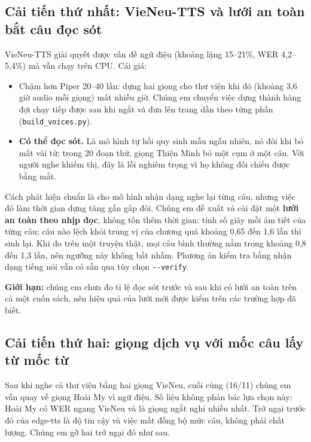 \documentclass[12pt,a4paper]{article}
\providecommand{\tightlist}{\setlength{\itemsep}{2pt}\setlength{\parskip}{0pt}}
\begin{document}
\subsection{Cải tiến thứ nhất: VieNeu-TTS và lưới an toàn bắt câu đọc sót}

VieNeu-TTS giải quyết được vấn đề ngữ điệu (khoảng lặng 15--21\%, WER 4,2--5,4\%) mà vẫn chạy trên CPU. Cái giá:

\begin{itemize}
\tightlist
\item
  Chậm hơn Piper 20--40 lần: dựng hai giọng cho thư viện khi đó (khoảng 3,6 giờ audio mỗi giọng) mất nhiều giờ. Chúng em chuyển việc dựng thành hàng đợi chạy tiếp được sau khi ngắt và đưa lên trang dần theo từng phần (\texttt{build\_voices.py}).
\item
  \textbf{Có thể đọc sót.} Là mô hình tự hồi quy sinh mẫu ngẫu nhiên, nó đôi khi bỏ mất vài từ; trong 20 đoạn thử, giọng Thiện Minh bỏ một cụm ở một câu. Với người nghe khiếm thị, đây là lỗi nghiêm trọng vì họ không đối chiếu được bằng mắt.
\end{itemize}

Cách phát hiện chuẩn là cho mô hình nhận dạng nghe lại từng câu, nhưng việc đó làm thời gian dựng tăng gần gấp đôi. Chúng em đề xuất và cài đặt một \textbf{lưới an toàn theo nhịp đọc}, không tốn thêm thời gian: tính số giây mỗi âm tiết của từng câu; câu nào lệch khỏi trung vị của chương quá khoảng 0,65 đến 1,6 lần thì sinh lại. Khi đo trên một truyện thật, mọi câu bình thường nằm trong khoảng 0,8 đến 1,3 lần, nên ngưỡng này không bắt nhầm. Phương án kiểm tra bằng nhận dạng tiếng nói vẫn có sẵn qua tùy chọn \texttt{-\/-verify}.

\textbf{Giới hạn:} chúng em chưa đo tỉ lệ đọc sót trước và sau khi có lưới an toàn trên cả một cuốn sách, nên hiệu quả của lưới mới được kiểm trên các trường hợp đã biết.

\subsection{Cải tiến thứ hai: giọng dịch vụ với mốc câu lấy từ mốc từ}

Sau khi nghe cả thư viện bằng hai giọng VieNeu, cuối cùng (16/11) chúng em vẫn quay về giọng Hoài My vì ngữ điệu. Số liệu không phản bác lựa chọn này: Hoài My có WER ngang VieNeu và là giọng ngắt nghỉ nhiều nhất. Trở ngại trước đó của edge-tts là độ tin cậy và việc mất đồng bộ mức câu, không phải chất lượng. Chúng em gỡ hai trở ngại đó như sau.
\end{document}
